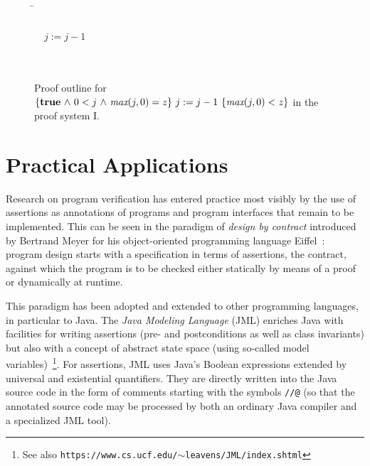 \documentclass[manuscript, screen, review]{acmart}
\begin{document}
 \begin{figure}[htbp]
 \begin{tabbing}
 \qquad\qquad    
\=       \\
\>                          \\
\>  \ \ $j:=j-1$                               \\
\>                             \\
\>                 \\
\end{tabbing}
\caption{Proof outline for $\mbox{$\{{\mbox{{\bf true}}\mbox{$\ \wedge\ $} 0<j\mbox{$\ \wedge\ $}  \mbox{\it max}(j,0)= z}\}\ {j:=j-1}\ \{{\mbox{\it max}(j,0) < z}\}$}$  in the proof system I.}
\label{fig:po3}

\end{figure}



\section{Practical Applications}
\label{sec:applications}

Research on program verification has entered practice most visibly by
the use of assertions as annotations of programs and program
interfaces that remain to be implemented.  This can be seen in the
paradigm of \emph{design by contract} introduced by Bertrand Meyer for
his object-oriented programming language Eiffel~\cite{Mey97}: program
design starts with a specification in terms of assertions, the
contract, against which the program is to be checked either statically
by means of a proof or dynamically at runtime.

This paradigm has been adopted and extended to other programming
languages, in particular to Java.
The \emph{Java Modeling Language} (JML) enriches Java with facilities for 
writing assertions (pre- and postconditions as well as 
class invariants) but also with a concept of abstract state space 
(using so-called model variables)~\cite{JML05}\footnote{See also
  \texttt{https://www.cs.ucf.edu/$\sim$leavens/JML/index.shtml}}.
For assertions, JML uses Java’s Boolean expressions extended by
universal and existential quantifiers. 
They are directly written into the Java source code in the form of comments 
starting with the symbols \texttt{//@}
(so that the annotated source code may be processed by both an ordinary Java compiler 
and a specialized JML tool). 
\end{document}

